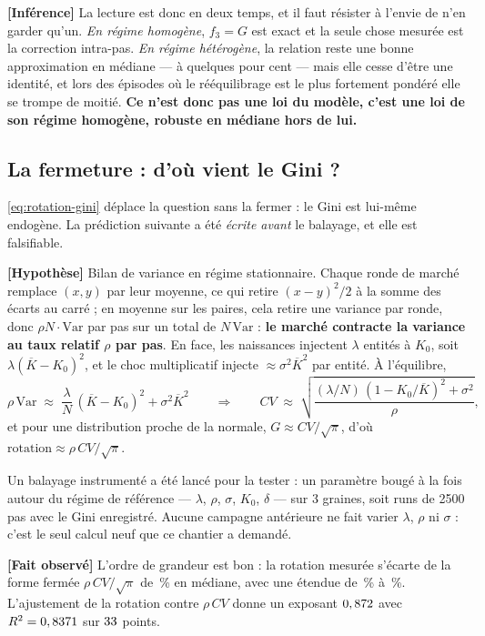 \documentclass[11pt,a4paper]{article}
\newcommand{\fait}{\textbf{[Fait observé]}}
\newcommand{\inference}{\textbf{[Inférence]}}
\newcommand{\hyp}{\textbf{[Hypothèse]}}
\begin{document}
\inference{} La lecture est donc en deux temps, et il faut résister à
l'envie de n'en garder qu'un. \emph{En régime homogène}, $f_3 = G$ est exact
et la seule chose mesurée est la correction intra-pas. \emph{En régime
hétérogène}, la relation reste une bonne approximation en médiane --- à
quelques pour cent --- mais elle cesse d'être une identité, et lors des
épisodes où le rééquilibrage est le plus fortement pondéré elle se trompe de
moitié. \textbf{Ce n'est donc pas une loi du modèle, c'est une loi de son
régime homogène, robuste en médiane hors de lui.}

\subsection{La fermeture : d'où vient le Gini ?}

\eqref{eq:rotation-gini} déplace la question sans la fermer : le Gini est
lui-même endogène. La prédiction suivante a été \emph{écrite avant} le
balayage, et elle est falsifiable.

\hyp{} Bilan de variance en régime stationnaire. Chaque ronde de marché
remplace $(x,y)$ par leur moyenne, ce qui retire $(x-y)^2/2$ à la somme des
écarts au carré ; en moyenne sur les paires, cela retire une variance par
ronde, donc $\rho N \cdot \mathrm{Var}$ par pas sur un total de
$N\,\mathrm{Var}$ : \textbf{le marché contracte la variance au taux relatif
$\rho$ par pas}. En face, les naissances injectent $\lambda$ entités à $K_0$,
soit $\lambda (\overline{K}-K_0)^2$, et le choc multiplicatif injecte
$\approx \sigma^2 \overline{K}^2$ par entité. À l'équilibre,
\begin{equation}
\rho\,\mathrm{Var} \;\approx\;
\frac{\lambda}{N}\,(\overline{K}-K_0)^2 + \sigma^2 \overline{K}^2
\qquad\Longrightarrow\qquad
CV \;\approx\;
\sqrt{\frac{(\lambda/N)\,(1 - K_0/\overline{K})^2 + \sigma^2}{\rho}} ,
\label{eq:cv}
\end{equation}
et pour une distribution proche de la normale, $G \approx CV/\sqrt{\pi}$, d'où
$\text{rotation} \approx \rho\,CV/\sqrt{\pi}$.

Un balayage instrumenté a été lancé pour la tester : un paramètre bougé à la
fois autour du régime de référence --- $\lambda$, $\rho$, $\sigma$, $K_0$,
$\delta$ --- sur 3 graines, soit \rotNInstrumented{} runs de 2500 pas avec le
Gini enregistré. Aucune campagne antérieure ne fait varier $\lambda$, $\rho$
ni $\sigma$ : c'est le seul calcul neuf que ce chantier a demandé.

\fait{} L'ordre de grandeur est bon : la rotation mesurée s'écarte de la forme
fermée $\rho\,CV/\sqrt{\pi}$ de \rotGapClosedFormMed\,\% en médiane, avec une
étendue de \rotGapClosedFormMin\,\% à \rotGapClosedFormMax\,\%.
L'ajustement de la rotation contre $\rho\,CV$ donne un exposant
$0,872$ avec $R^2 = 0,8371$ sur $33$
points.
\end{document}

